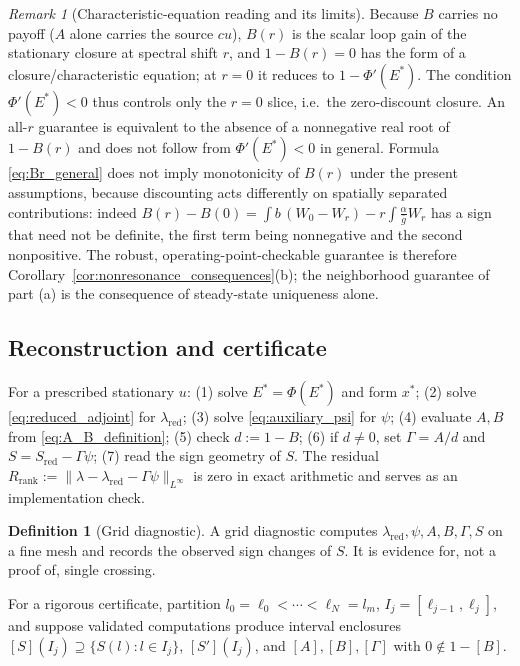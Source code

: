 \documentclass[pdflatex,sn-mathphys-num]{sn-jnl}
\theoremstyle{plain}
\theoremstyle{definition}
\newtheorem{definition}[theorem]{Definition}
\theoremstyle{remark}
\newtheorem{remark}[theorem]{Remark}
\begin{document}
\begin{remark}[Characteristic-equation reading and its limits]
\label{rmk:characteristic_reading}
Because $B$ carries no payoff ($A$ alone carries the source $cu$), $B(r)$ is the
scalar loop gain of the stationary closure at spectral shift $r$, and
$1-B(r)=0$ has the form of a closure/characteristic equation; at $r=0$ it reduces
to $1-\Phi'(E^*)$. The condition $\Phi'(E^*)<0$ thus controls only the $r=0$
slice, i.e.\ the zero-discount closure. An all-$r$ guarantee is equivalent
to the absence of a nonnegative real root of $1-B(r)$ and does not follow
from $\Phi'(E^*)<0$ in general. Formula \eqref{eq:Br_general} does not imply
monotonicity of $B(r)$ under the present assumptions, because discounting acts
differently on spatially separated contributions: indeed
$B(r)-B(0)=\int b\,(W_0-W_r)-r\int\frac{\alpha}{\bar g}W_r$ has a sign that need
not be definite, the first term being nonnegative and the second nonpositive. The
robust, operating-point-checkable guarantee is therefore
Corollary~\ref{cor:nonresonance_consequences}(b); the neighborhood guarantee of
part (a) is the consequence of steady-state uniqueness alone.
\end{remark}

\subsection{Reconstruction and certificate}
\label{subsec:reconstruction_procedure}

For a prescribed stationary $u$: (1) solve $E^*=\Phi(E^*)$ and form $x^*$; (2)
solve \eqref{eq:reduced_adjoint} for $\lambda_{\mathrm{red}}$; (3) solve
\eqref{eq:auxiliary_psi} for $\psi$; (4) evaluate $A,B$ from
\eqref{eq:A_B_definition}; (5) check $d:=1-B$; (6) if $d\neq0$, set
$\Gamma=A/d$ and $S=S_{\mathrm{red}}-\Gamma\psi$; (7) read the sign geometry of
$S$. The residual
$R_{\mathrm{rank}}:=\|\lambda-\lambda_{\mathrm{red}}-\Gamma\psi\|_{L^\infty}$ is
zero in exact arithmetic and serves as an implementation check.

\begin{definition}[Grid diagnostic]
\label{def:grid_diagnostic}
A grid diagnostic computes $\lambda_{\mathrm{red}},\psi,A,B,\Gamma,S$ on a fine
mesh and records the observed sign changes of $S$. It is evidence for, not a proof
of, single crossing.
\end{definition}

For a rigorous certificate, partition $l_0=\ell_0<\cdots<\ell_N=l_m$,
$I_j=[\ell_{j-1},\ell_j]$, and suppose validated computations produce interval
enclosures $[S](I_j)\supseteq\{S(l):l\in I_j\}$, $[S'](I_j)$, and $[A],[B],[\Gamma]$
with $0\notin1-[B]$.
\end{document}

